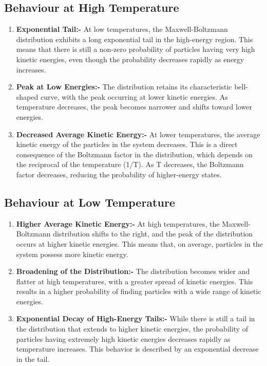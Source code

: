 \documentclass{article}
\begin{document}
\subsection*{Behaviour at High Temperature}
\begin{enumerate}
    \item \textbf{Exponential Tail:-} At low temperatures, the Maxwell-Boltzmann distribution exhibits a long exponential tail in the high-energy region. This means that there is still a non-zero probability of particles having very high kinetic energies, even though the probability decreases rapidly as energy increases.
    \item \textbf{Peak at Low Energies:-} The distribution retains its characteristic bell-shaped curve, with the peak occurring at lower kinetic energies. As temperature decreases, the peak becomes narrower and shifts toward lower energies.
    \item \textbf{Decreased Average Kinetic Energy:-} At lower temperatures, the average kinetic energy of the particles in the system decreases. This is a direct consequence of the Boltzmann factor in the distribution, which depends on the reciprocal of the temperature (1/T). As T decreases, the Boltzmann factor decreases, reducing the probability of higher-energy states.
\end{enumerate}

\subsection*{Behaviour at Low Temperature}

\begin{enumerate}
    \item \textbf{Higher Average Kinetic Energy:-} At high temperatures, the Maxwell-Boltzmann distribution shifts to the right, and the peak of the distribution occurs at higher kinetic energies. This means that, on average, particles in the system possess more kinetic energy.
    \item \textbf{Broadening of the Distribution:-} The distribution becomes wider and flatter at high temperatures, with a greater spread of kinetic energies. This results in a higher probability of finding particles with a wide range of kinetic energies.
    \item \textbf{Exponential Decay of High-Energy Tails:-} While there is still a tail in the distribution that extends to higher kinetic energies, the probability of particles having extremely high kinetic energies decreases rapidly as temperature increases. This behavior is described by an exponential decrease in the tail.
\end{enumerate}
\end{document}

